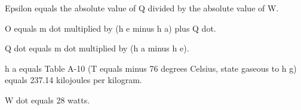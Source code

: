 Epsilon equals the absolute value of Q divided by the absolute value of W.  

O equals m dot multiplied by (h e minus h a) plus Q dot.  

Q dot equals m dot multiplied by (h a minus h e).  

h a equals Table A-10 (T equals minus 76 degrees Celsius, state gaseous to h g) equals 237.14 kilojoules per kilogram.  

W dot equals 28 watts.